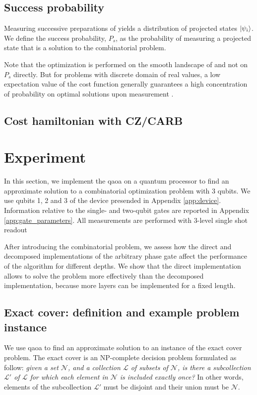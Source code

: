 \subsection{Success probability}
Measuring successive preparations of \optimalstate yields a distribution of projected states $\ket{\psi_i}$.
We define the success probability, $P_s$, as the probability of measuring a projected state that is a solution to the combinatorial problem. 

Note that the optimization is performed on the smooth landscape of \cost{} and not on $P_s$ directly. But for problems with discrete domain of real values, a low expectation value of the cost function generally guarantees a high concentration of probability on optimal solutions upon measurement \cite{Cook2019TheCover, Wang2019XY-mixers:QAOA}.

\subsection{Cost hamiltonian with CZ/CARB}



\section{Experiment}
In this section, we implement the \gls{qaoa} on a quantum processor to find an approximate solution to a combinatorial optimization problem with 3 qubits. We use qubits 1, 2 and 3 of the device presended in Appendix \ref{app:device}. Information relative to the single- and two-qubit gates are reported in Appendix \ref{app:gate_parameters}. All measurements are performed with 3-level single shot readout

After introducing the combinatorial problem, we assess how the direct and decomposed implementations of the arbitrary phase gate affect the performance of the algorithm for different depths. We show that the direct implementation allows to solve the problem more effectively than the decomposed implementation, because more layers can be implemented for a fixed length. 

\subsection{Exact cover: definition and example problem instance}
We use \gls{qaoa} to find an approximate solution to an instance of the exact cover problem. The exact cover \cite{Karp1972ReducibilityProblems} is an NP-complete \cite{GareyM1990} decision problem formulated as follow: \textit{given a set $\mathcal{N}$, and a collection $\mathcal{L}$ of subsets of $\mathcal{N}$, is there a subcollection $\mathcal{L}'$ of $\mathcal{L}$ for which each element in $\mathcal{N}$ is included exactly once?} In other words, elements of the subcollection $\mathcal{L}'$ must be disjoint and their union must be $\mathcal{N}$.

